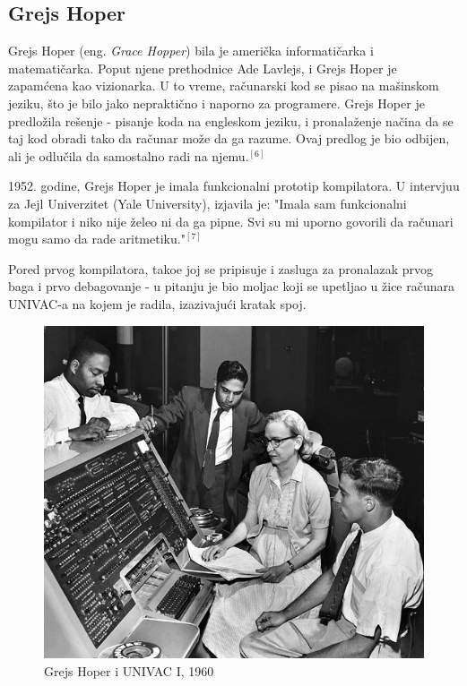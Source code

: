 \documentclass[12pt]{article}
\begin{document}
\subsection{Grejs Hoper}
\begin{text}
Grejs Hoper (eng. \textit{Grace Hopper}) bila je američka informatičarka i matematičarka. Poput njene prethodnice Ade Lavlejs, i Grejs Hoper je zapamćena kao vizionarka. U to vreme, računarski kod se pisao na mašinskom jeziku, što je bilo jako nepraktično i naporno za programere. Grejs Hoper je predložila rešenje - pisanje koda na engleskom jeziku, i pronalaženje načina da se taj kod obradi tako da računar može da ga razume. Ovaj predlog je bio odbijen, ali je odlučila da samostalno radi na njemu.$^{[6]}$

1952. godine, Grejs Hoper je imala funkcionalni prototip kompilatora. U intervjuu za Jejl Univerzitet (Yale University), izjavila je: "Imala sam funkcionalni kompilator i niko nije želeo ni da ga pipne. Svi su mi uporno govorili da računari mogu samo da rade aritmetiku."$^{[7]}$

Pored prvog kompilatora, tako\dj e joj se pripisuje i zasluga za pronalazak prvog baga i prvo debagovanje - u pitanju je bio moljac koji se upetljao u žice računara UNIVAC-a na kojem je radila, izazivajući kratak spoj. 

\begin{figure}[htp]
    \centering
    \includegraphics[width=0.8\linewidth]{gracehopper.png}
    \caption{Grejs Hoper i UNIVAC I, 1960}
\end{figure}

\end{text}
\end{document}
